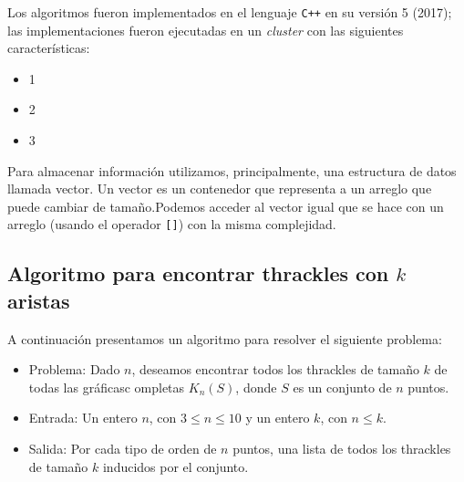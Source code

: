 Los algoritmos fueron implementados en el lenguaje \texttt{C++} en su versión 5 (2017);
las implementaciones fueron ejecutadas en un \emph{cluster} con las siguientes características:
\begin{itemize}
  \item 1
  \item 2
  \item 3
\end{itemize}
Para almacenar información utilizamos, principalmente, una estructura de datos llamada vector. Un vector es un contenedor que representa a un arreglo que puede cambiar de tamaño.Podemos acceder al vector igual que se hace con un arreglo (usando el operador \texttt{[]}) con la misma complejidad.

\subsection{Algoritmo para encontrar thrackles con $k$
  aristas}\label{seccion_algoritmo_kthrackles}
  A continuación presentamos un algoritmo para resolver el siguiente problema:
  \begin{itemize}
    \item[] Problema: Dado $n$, deseamos encontrar todos los thrackles de tamaño $k$ de todas las gráficasc ompletas $K_n(S)$, donde $S$ es un conjunto de $n$ puntos.
    \item[] Entrada: Un entero $n$, con $ 3 \leq n \leq 10$ y un entero $k$, con $ n \leq
    k$.
    \item[] Salida: Por cada tipo de orden de $n$ puntos, una lista de todos los thrackles de tamaño $k$ inducidos por el conjunto.
  \end{itemize}

